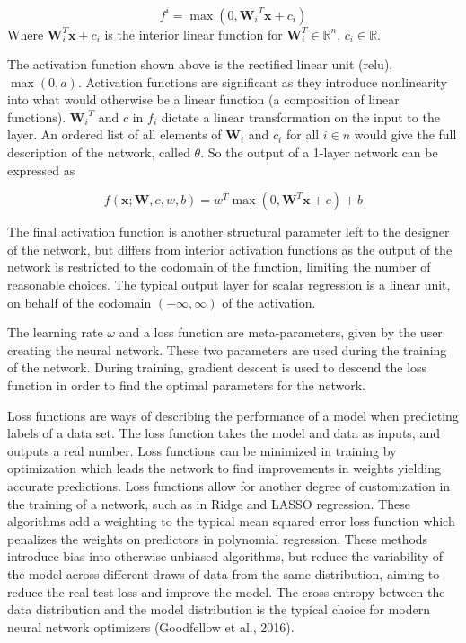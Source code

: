 \documentclass[12pt,twoside]{reedthesis}
\begin{document}
\[
f^i = \max ( 0 , {\boldsymbol{W}_i}^T \boldsymbol{x} + c_i)
\] Where \(\boldsymbol{W}_i^T \boldsymbol{x} + c_i\) is the interior
linear function for \(\boldsymbol{W}_i^T \in \mathbb{R}^n\),
\(c_i \in \mathbb{R}\).

The activation function shown above is the rectified linear unit (relu),
\(\max(0,a)\). Activation functions are significant as they introduce
nonlinearity into what would otherwise be a linear function (a
composition of linear functions). \({\boldsymbol{W}_i}^T\) and \(c\) in
\(f_i\) dictate a linear transformation on the input to the layer. An
ordered list of all elements of \(\boldsymbol{W}_i\) and \(c_i\) for all
\(i \in n\) would give the full description of the network, called
\(\theta\). So the output of a 1-layer network can be expressed as

\[
f(\boldsymbol{x}; \boldsymbol{W}, c, w, b) = w^T \max( 0 , \boldsymbol{W}^T \boldsymbol{x} +c ) +b
\]

The final activation function is another structural parameter left to
the designer of the network, but differs from interior activation
functions as the output of the network is restricted to the codomain of
the function, limiting the number of reasonable choices. The typical
output layer for scalar regression is a linear unit, on behalf of the
codomain \((-\infty, \infty)\) of the activation.

The learning rate \(\omega\) and a loss function are meta-parameters,
given by the user creating the neural network. These two parameters are
used during the training of the network. During training, gradient
descent is used to descend the loss function in order to find the
optimal parameters for the network.

Loss functions are ways of describing the performance of a model when
predicting labels of a data set. The loss function takes the model and
data as inputs, and outputs a real number. Loss functions can be
minimized in training by optimization which leads the network to find
improvements in weights yielding accurate predictions. Loss functions
allow for another degree of customization in the training of a network,
such as in Ridge and LASSO regression. These algorithms add a weighting
to the typical mean squared error loss function which penalizes the
weights on predictors in polynomial regression. These methods introduce
bias into otherwise unbiased algorithms, but reduce the variability of
the model across different draws of data from the same distribution,
aiming to reduce the real test loss and improve the model. The cross
entropy between the data distribution and the model distribution is the
typical choice for modern neural network optimizers (Goodfellow et al.,
2016).
\end{document}
